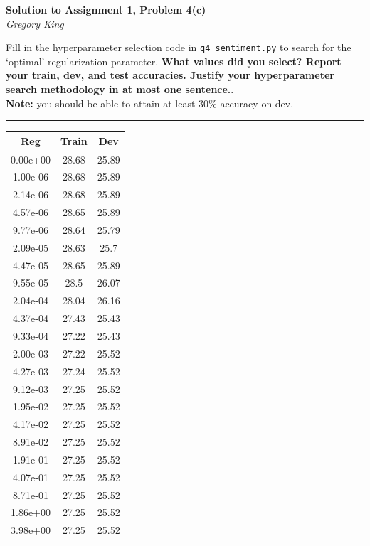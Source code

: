 \documentclass[letter,12pt]{article}
\newcommand{\myhwtitle}[3]
{\begin{center}
{\large {\bf Solution to Assignment {#1}, Problem {#2}}}\\
\medskip 
{\it {#3}} %
\end{center}}
\begin{document}
\myhwtitle{1}{4(c)}{Gregory King}

\bigskip
\noindent Fill in the hyperparameter selection code in \texttt{q4\_sentiment.py} to search for the `optimal' regularization parameter. \textbf{What values did you select? Report your train, dev, and test accuracies. Justify your hyperparameter search methodology in at most one sentence.}. \\

\noindent\textbf{Note:} you should be able to attain at least 30\% accuracy on dev.\vspace{5mm}

\noindent\rule{\textwidth}{0.4pt}\vspace{5mm}

\begin{table}[!h!p]
\begin{center}
\begin{tabular}{c c c}
\hline\hline
Reg & Train & Dev \\
\hline
0.00e+00 & 28.68 & 25.89 \\
1.00e-06 & 28.68 & 25.89 \\
2.14e-06 & 28.68 & 25.89 \\
4.57e-06 & 28.65 & 25.89 \\
9.77e-06 & 28.64 & 25.79 \\
2.09e-05 & 28.63 & 25.7 \\
4.47e-05 & 28.65 & 25.89 \\
9.55e-05 & 28.5 & 26.07 \\
2.04e-04 & 28.04 & 26.16 \\
4.37e-04 & 27.43 & 25.43 \\
9.33e-04 & 27.22 & 25.43 \\
2.00e-03 & 27.22 & 25.52 \\
4.27e-03 & 27.24 & 25.52 \\
9.12e-03 & 27.25 & 25.52 \\
1.95e-02 & 27.25 & 25.52 \\
4.17e-02 & 27.25 & 25.52 \\
8.91e-02 & 27.25 & 25.52 \\
1.91e-01 & 27.25 & 25.52 \\
4.07e-01 & 27.25 & 25.52 \\
8.71e-01 & 27.25 & 25.52 \\
1.86e+00 & 27.25 & 25.52 \\
3.98e+00 & 27.25 & 25.52 \\
\hline\hline
\end{tabular}
\end{center}
\end{table}
\end{document}
